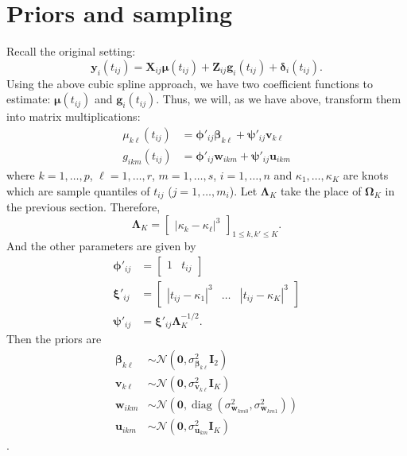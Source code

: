 \documentclass[11pt]{article}
\newcommand{\bs}{\boldsymbol}
\newcommand{\opn}{\operatorname}
\begin{document}
\section{Priors and sampling}
Recall the original setting:
\begin{equation}
  \bs{y}_{i}\left(t_{ij}\right) = \bs{X}_{ij}\bs{\mu}\left(t_{ij}\right) + \bs{Z}_{ij}\bs{g}_{i}\left(t_{ij}\right) + \bs{\delta}_{i}\left(t_{ij}\right).
\end{equation}
Using the above cubic spline approach, we have two coefficient functions to estimate: $\bs{\mu}\left(t_{ij}\right)$ and $\bs{g}_{i}\left(t_{ij}\right)$. Thus, we will, as we have above, transform them into matrix multiplications:
\begin{align}
  \mu_{k\ell}\left(t_{ij}\right) &= \bs{\phi}'_{ij}\bs{\beta}_{k\ell} + \bs{\psi}'_{ij}\bs{v}_{k\ell}\\
  g_{ikm}\left(t_{ij}\right) &= \bs{\phi}'_{ij}\bs{w}_{ikm} + \bs{\psi}'_{ij}\bs{u}_{ikm}
\end{align}
where $k = 1,\ldots , p$, $\ell = 1, \ldots , r$, $m = 1,\ldots, s$, $i = 1,\ldots , n$ and $\kappa_{1},\ldots , \kappa_{K}$ are knots which are sample quantiles of $t_{ij}$ ($j=1,\ldots , m_{i}$). Let $\bs{\Lambda}_{K}$ take the place of $\bs{\Omega}_{K}$ in the previous section. Therefore,
\begin{equation}
  \bs{\Lambda}_{K} = \begin{bmatrix} \left| \kappa_{k}-\kappa_{\ell}\right|^{3}\end{bmatrix}_{1\leq k, k'\leq K}.
\end{equation}
And the other parameters are given by
\begin{align}
  \bs{\phi}'_{ij} &= \begin{bmatrix}1 & t_{ij} \end{bmatrix}\\
  \bs{\xi}'_{ij} &= \begin{bmatrix} \left|t_{ij}-\kappa_{1}\right|^{3} & \ldots  & \left|t_{ij}-\kappa_{K}\right|^{3}\end{bmatrix}\\
  \bs{\psi}'_{ij} &= \bs{\xi}'_{ij}\bs{\Lambda}_{K}^{-1/2}.
\end{align}
Then the priors are
\begin{align}
  \bs{\beta}_{k\ell} &\sim \mathcal{N}\left(\bs{0}, \sigma_{\bs{\beta}_{k\ell}}^{2}\bs{I}_{2}\right)\\
  \bs{v}_{k\ell} &\sim \mathcal{N}\left(\bs{0}, \sigma_{\bs{v}_{k\ell}}^{2}\bs{I}_{K}\right)\\
  \bs{w}_{ikm} &\sim \mathcal{N}\left(\bs{0}, \opn{diag}\left(\sigma_{\bs{w}_{km0}}^{2}, \sigma_{\bs{w}_{km1}}^{2}\right)\right)\\
  \bs{u}_{ikm} &\sim \mathcal{N}\left(\bs{0}, \sigma_{\bs{u}_{km}}^{2}\bs{I}_{K} \right)
\end{align}.
\end{document}
